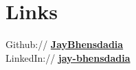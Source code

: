\documentclass[]{deedy-resume-reversed}
\begin{document}
\begin{minipage}[t]{0.33\textwidth}



\section{Links}
Github:// \href{https://github.com/jaybhensdadia/}{\bf JayBhensdadia} \\
LinkedIn://  \href{https://www.linkedin.com/in/jay-bhensdadia/}{\bf jay-bhensdadia}
\sectionsep

\end{minipage}
\end{document}
